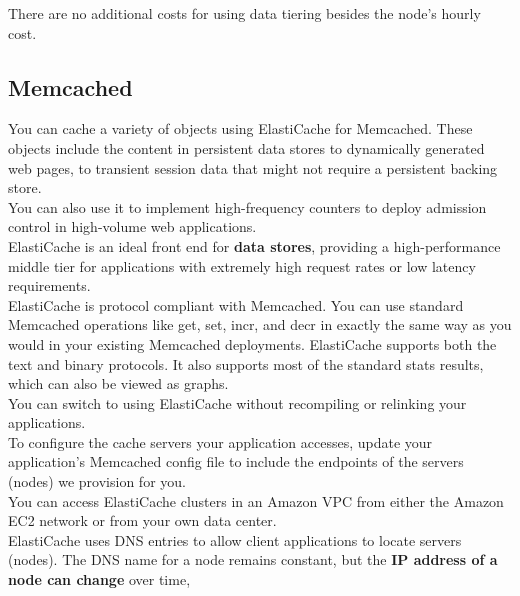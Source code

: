 \documentclass[12pt, letterpaper, twoside]{article}
\begin{document}
There are no additional costs for using data tiering besides the node’s hourly cost.\\

\subsection{Memcached}
You can cache a variety of objects using ElastiCache for Memcached. These objects include the content in persistent data stores
to dynamically generated web pages, to transient session data that might not require a persistent backing store.\\
You can also use it to implement high-frequency counters to deploy admission control in high-volume web applications.\\

ElastiCache is an ideal front end for \textbf{data stores}, providing a high-performance middle tier for applications 
with extremely high request rates or low latency requirements.\\

ElastiCache is protocol compliant with Memcached. You can use standard Memcached operations like get, set, incr, and 
decr in exactly the same way as you would in your existing Memcached deployments.
ElastiCache supports both the text and binary protocols. It also supports most of the standard stats results, which can 
also be viewed as graphs.\\
You can switch to using ElastiCache without recompiling or relinking your applications.\\
To configure the cache servers your application accesses, update your application's Memcached config file to include the 
endpoints of the servers (nodes) we provision for you.\\

You can access ElastiCache clusters in an Amazon VPC from either the Amazon EC2 network or from your own data center.\\
ElastiCache uses DNS entries to allow client applications to locate servers (nodes). The DNS name for a node remains 
constant, but the \textbf{IP address of a node can change} over time,
\end{document}

